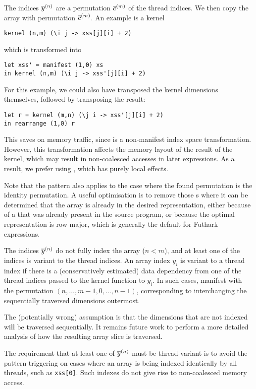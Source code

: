 \begin{description}[style=nextline]
\item[Complete Index]

  The indices $\overline{y}^{(n)}$ are a permutation $\overline{c}^{(m)}$ of the
  thread indices.  We then copy the array with permutation
  $\overline{c}^{(m)}$.  An example is a kernel
\begin{lstlisting}[xleftmargin=0.5cm,numbers=none]
kernel (n,m) (\i j -> xss[j][i] + 2)
\end{lstlisting}
which is transformed into
\begin{lstlisting}[xleftmargin=0.5cm,numbers=none]
let xss' = manifest (1,0) xs
in kernel (n,m) (\i j -> xss'[j][i] + 2)
\end{lstlisting}

For this example, we could also have transposed the kernel dimensions
themselves, followed by transposing the result:
\begin{lstlisting}[xleftmargin=0.5cm,numbers=none]
let r = kernel (m,n) (\j i -> xss'[j][i] + 2)
in rearrange (1,0) r
\end{lstlisting}
This saves on memory traffic, since  is a non-manifest
index space transformation.  However, this transformation affects the
memory layout of the result of the kernel, which may result in
non-coalesced accesses in later expressions.  As a result, we prefer
using , which has purely local effects.

Note that the pattern also applies to the case where the found
permutation is the identity permutation.  A useful optimisation is to
remove those s where it can be determined that the array
is already in the desired representation, either because of a
 that was already present in the source program, or
because the optimal representation is row-major, which is generally
the default for Futhark expressions.

\item[Incomplete Index]

  The indices $\overline{y}^{(n)}$ do not fully index the array ($n<m$), and
  at least one of the indices is variant to the thread indices.  An
  array index $y_{i}$ is variant to a thread index if there is a
  (conservatively estimated) data dependency from one of the thread
  indices passed to the kernel function to $y_{i}$.  In such cases,
  manifest with the permutation $(n,\ldots,m-1,0,\ldots,n-1)$,
  corresponding to interchanging the sequentially traversed dimensions
  outermost.

  The (potentially wrong) assumption is that the dimensions that are
  not indexed will be traversed sequentially.  It remains future work
  to perform a more detailed analysis of how the resulting array slice
  is traversed.

  The requirement that at least one of $\overline{y}^{(n)}$ must be
  thread-variant is to avoid the pattern triggering on cases where an
  array is being indexed identically by all threads, such as
  \lstinline{xss[0]}.  Such indexes do not give rise to non-coalesced
  memory access.
\end{description}

